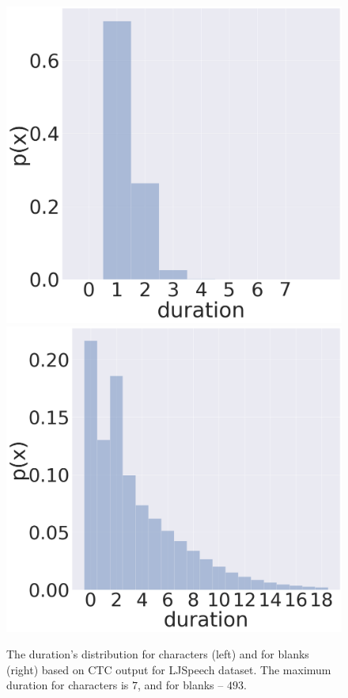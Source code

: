 \begin{figure}[!ht]
\centering
\includegraphics[width=.48\linewidth]{images/durs-dist.png}
\includegraphics[width=.48\linewidth]{images/blanks-dist.png}
\caption{The duration's distribution for characters (left) and for blanks (right) based on CTC output for LJSpeech dataset. The maximum duration for characters is $7$, and for blanks -- $493$.}
\label{fig:durs-dist}
\end{figure}

\begin{table}[!ht]
\centering
{}
\caption{Grapheme duration predictor is based on QuartzNet 5x5.}
\label{tab:durs-model}
\end{table}

